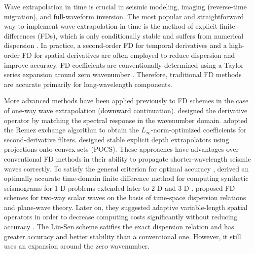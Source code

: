 Wave extrapolation in time is crucial in seismic modeling, imaging (reverse-time migration), and full-waveform inversion. 
The most popular and straightforward way to implement wave extrapolation in time is 
the method of explicit finite differences (FDs), 
which is only conditionally stable and 
suffers from numerical dispersion \cite[]{Wu,kastner}. 
In practice, a second-order FD for temporal derivatives and a high-order FD for spatial derivatives are often employed to reduce dispersion and improve accuracy.
FD coefficients are conventionally determined using a Taylor-series expansion around zero wavenumber \cite[]{dablain,kindelan}.
Therefore, traditional FD methods are accurate primarily for long-wavelength components.
 
More advanced methods have been applied previously to FD schemes in the case of one-way wave extrapolation (downward continuation).
\cite{holberg,holberg1} designed the derivative operator by matching the spectral response in the wavenumber domain.
\cite{soubaras} adopted the Remez exchange algorithm to obtain the $L_{\infty}$-norm-optimized coefficients for second-derivative filters.  
\cite{mousa} designed stable explicit depth extrapolators using projections onto convex sets (POCS). 
These approaches have advantages over conventional FD methods in their ability to propagate shorter-wavelength seismic waves correctly. 
To satisfy the general criterion for optimal accuracy \cite[]{gellerg},
\cite{geller1} derived an optimally accurate time-domain finite difference method for computing
synthetic seismograms for 1-D problems extended later to 2-D and 3-D \cite[]{geller2}.
\cite{liu} proposed FD schemes for two-way scalar waves on the basis of time-space dispersion relations and plane-wave theory.
Later on, they suggested adaptive variable-length spatial operators in order to decrease computing costs significantly without reducing accuracy \cite[]{adapt}.
The Liu-Sen scheme satifies the exact dispersion relation and has greater accuracy and better stability than a conventional one. However, it still uses an expansion around the zero wavenumber.\\

